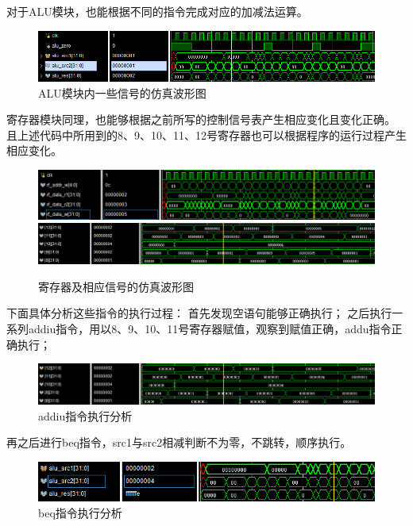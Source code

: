 \documentclass[]{USTBReport}
\begin{document}
    对于ALU模块，也能根据不同的指令完成对应的加减法运算。
    \begin{figure}[H]
        \centering
        \includegraphics[width=\linewidth]{figure/image6}
        \caption{ALU模块内一些信号的仿真波形图}
    \end{figure}

    寄存器模块同理，也能够根据之前所写的控制信号表产生相应变化且变化正确。
    且上述代码中所用到的8、9、10、11、12号寄存器也可以根据程序的运行过程产生相应变化。
    \begin{figure}[H]
        \centering
        \includegraphics[width=\linewidth]{figure/image7}
        \includegraphics[width=\linewidth]{figure/image8}
        \caption{寄存器及相应信号的仿真波形图}
    \end{figure}

    下面具体分析这些指令的执行过程：
    首先发现空语句能够正确执行；
    之后执行一系列addiu指令，用以8、9、10、11号寄存器赋值，观察到赋值正确，addu指令正确执行；

    \begin{figure}[H]
        \centering
        \includegraphics[width=\linewidth]{figure/image9}
        \caption{addiu指令执行分析}
    \end{figure}

    再之后进行beq指令，src1与src2相减判断不为零，不跳转，顺序执行。
    \begin{figure}[H]
        \centering
        \includegraphics[width=\linewidth]{figure/image10}
        \caption{beq指令执行分析}
    \end{figure}
\end{document}
